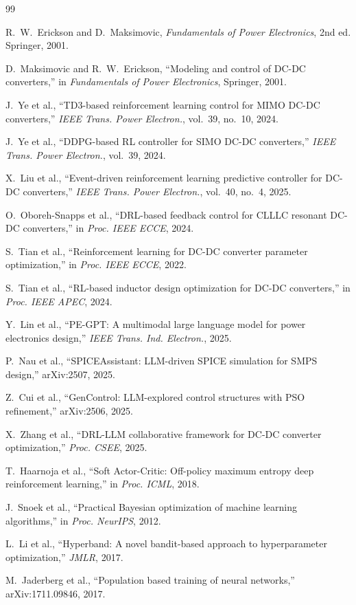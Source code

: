 \documentclass[11pt,a4paper]{article}
\begin{document}

\begin{thebibliography}{99}

R.~W.~Erickson and D.~Maksimovic, \textit{Fundamentals of Power Electronics}, 2nd ed. Springer, 2001.

D.~Maksimovic and R.~W.~Erickson, ``Modeling and control of DC-DC converters,'' in \textit{Fundamentals of Power Electronics}, Springer, 2001.

J.~Ye et al., ``TD3-based reinforcement learning control for MIMO DC-DC converters,'' \textit{IEEE Trans. Power Electron.}, vol.~39, no.~10, 2024.

J.~Ye et al., ``DDPG-based RL controller for SIMO DC-DC converters,'' \textit{IEEE Trans. Power Electron.}, vol.~39, 2024.

X.~Liu et al., ``Event-driven reinforcement learning predictive controller for DC-DC converters,'' \textit{IEEE Trans. Power Electron.}, vol.~40, no.~4, 2025.

O.~Oboreh-Snapps et al., ``DRL-based feedback control for CLLLC resonant DC-DC converters,'' in \textit{Proc. IEEE ECCE}, 2024.

S.~Tian et al., ``Reinforcement learning for DC-DC converter parameter optimization,'' in \textit{Proc. IEEE ECCE}, 2022.

S.~Tian et al., ``RL-based inductor design optimization for DC-DC converters,'' in \textit{Proc. IEEE APEC}, 2024.

Y.~Lin et al., ``PE-GPT: A multimodal large language model for power electronics design,'' \textit{IEEE Trans. Ind. Electron.}, 2025.

P.~Nau et al., ``SPICEAssistant: LLM-driven SPICE simulation for SMPS design,'' arXiv:2507, 2025.

Z.~Cui et al., ``GenControl: LLM-explored control structures with PSO refinement,'' arXiv:2506, 2025.

X.~Zhang et al., ``DRL-LLM collaborative framework for DC-DC converter optimization,'' \textit{Proc. CSEE}, 2025.

T.~Haarnoja et al., ``Soft Actor-Critic: Off-policy maximum entropy deep reinforcement learning,'' in \textit{Proc. ICML}, 2018.

J.~Snoek et al., ``Practical Bayesian optimization of machine learning algorithms,'' in \textit{Proc. NeurIPS}, 2012.

L.~Li et al., ``Hyperband: A novel bandit-based approach to hyperparameter optimization,'' \textit{JMLR}, 2017.

M.~Jaderberg et al., ``Population based training of neural networks,'' arXiv:1711.09846, 2017.

\end{thebibliography}
\end{document}
